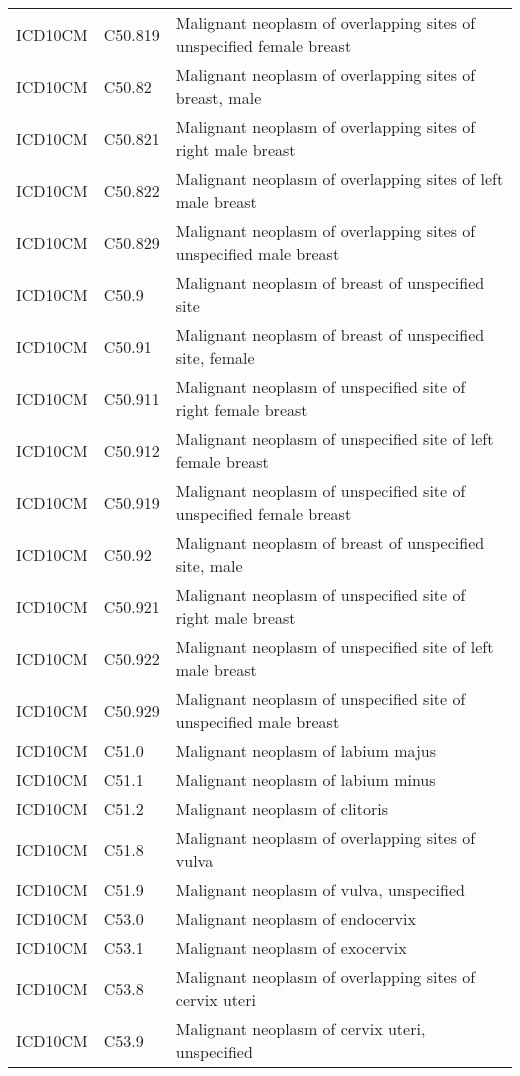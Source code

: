 \begin{longtable}{p{}p{}p{}}
  ICD10CM & C50.819 & Malignant neoplasm of overlapping sites of unspecified female breast \\ 
  ICD10CM & C50.82 & Malignant neoplasm of overlapping sites of breast, male \\ 
  ICD10CM & C50.821 & Malignant neoplasm of overlapping sites of right male breast \\ 
  ICD10CM & C50.822 & Malignant neoplasm of overlapping sites of left male breast \\ 
  ICD10CM & C50.829 & Malignant neoplasm of overlapping sites of unspecified male breast \\ 
  ICD10CM & C50.9 & Malignant neoplasm of breast of unspecified site \\ 
  ICD10CM & C50.91 & Malignant neoplasm of breast of unspecified site, female \\ 
  ICD10CM & C50.911 & Malignant neoplasm of unspecified site of right female breast \\ 
  ICD10CM & C50.912 & Malignant neoplasm of unspecified site of left female breast \\ 
  ICD10CM & C50.919 & Malignant neoplasm of unspecified site of unspecified female breast \\ 
  ICD10CM & C50.92 & Malignant neoplasm of breast of unspecified site, male \\ 
  ICD10CM & C50.921 & Malignant neoplasm of unspecified site of right male breast \\ 
  ICD10CM & C50.922 & Malignant neoplasm of unspecified site of left male breast \\ 
  ICD10CM & C50.929 & Malignant neoplasm of unspecified site of unspecified male breast \\ 
  ICD10CM & C51.0 & Malignant neoplasm of labium majus \\ 
  ICD10CM & C51.1 & Malignant neoplasm of labium minus \\ 
  ICD10CM & C51.2 & Malignant neoplasm of clitoris \\ 
  ICD10CM & C51.8 & Malignant neoplasm of overlapping sites of vulva \\ 
  ICD10CM & C51.9 & Malignant neoplasm of vulva, unspecified \\ 
  ICD10CM & C53.0 & Malignant neoplasm of endocervix \\ 
  ICD10CM & C53.1 & Malignant neoplasm of exocervix \\ 
  ICD10CM & C53.8 & Malignant neoplasm of overlapping sites of cervix uteri \\ 
  ICD10CM & C53.9 & Malignant neoplasm of cervix uteri, unspecified \\ 

\end{longtable}

